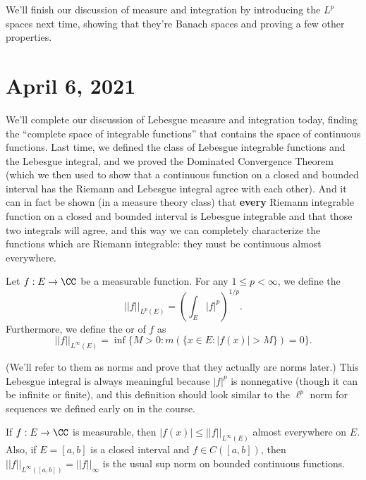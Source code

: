 We'll finish our discussion of measure and integration by introducing the $L^p$ spaces next time, showing that they're Banach spaces and proving a few other properties.


\pagebreak\section*{April 6, 2021}

We'll complete our discussion of Lebesgue measure and integration today, finding the ``complete space of integrable functions'' that contains the space of continuous functions. Last time, we defined the class of Lebesgue integrable functions and the Lebesgue integral, and we proved the Dominated Convergence Theorem (which we then used to show that a continuous function on a closed and bounded interval has the Riemann and Lebesgue integral agree with each other). And it can in fact be shown (in a measure theory class) that \textbf{every} Riemann integrable function on a closed and bounded interval is Lebesgue integrable and that those two integrals will agree, and this way we can completely characterize the functions which are Riemann integrable: they must be continuous almost everywhere. 

\begin{definition}
Let $f: E \to \CC$ be a measurable function. For any $1 \le p < \infty$, we define the 
\[
    ||f||_{L^p(E)} = \left(\int_E |f|^p\right)^{1/p}.
\]
Furthermore, we define the  or  of $f$ as
\[
    ||f||_{L^\infty(E)} = \inf\{M > 0: m(\{x \in E: |f(x)| > M \}) = 0\}.
\]
\end{definition}

(We'll refer to them as norms and prove that they actually are norms later.) This Lebesgue integral is always meaningful because $|f|^p$ is nonnegative (though it can be infinite or finite), and this definition should look similar to the $\ell^p$ norm for sequences we defined early on in the course.

\begin{proposition}
If $f: E \to \CC$ is measurable, then $|f(x)| \le ||f||_{L^{\infty}(E)}$ almost everywhere on $E$. Also, if $E = [a, b]$ is a closed interval and $f \in C([a, b])$, then $||f||_{L^\infty([a, b])} = ||f||_{\infty}$ is the usual sup norm on bounded continuous functions.
\end{proposition}

